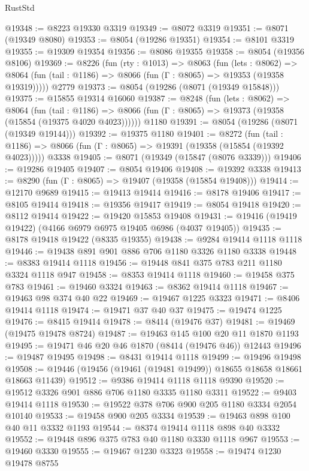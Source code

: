 \begin{lexlean}{RustStd}
\begin{coremodule}
@19348 := @8223 @19330 @3319
@19349 := @8072 @3319
@19351 := @8071 (@19349 @8080)
@19353 := @8054 (@19286 @19351)
@19354 := @8101 @3319
@19355 := @19309 @19354
@19356 := @8086 @19355
@19358 := @8054 (@19356 @8106)
@19369 := @8226
    (fun (rty : @1013) =>
    @8063
      (fun (lets : @8062) =>
      @8064 (fun (tail : @1186) => @8066 (fun (Γ : @8065) => @19353 (@19358 @19319)))))
    @2779
@19373 := @8054 (@19286 (@8071 (@19349 @15848)))
@19375 := @15855 @19314 @16060
@19387 := @8248
    (fun (lets : @8062) =>
    @8064
      (fun (tail : @1186) =>
      @8066 (fun (Γ : @8065) => @19373 (@19358 (@15854 (@19375 @4020 @4023))))))
    @1180
@19391 := @8054 (@19286 (@8071 (@19349 @19144)))
@19392 := @19375 @1180
@19401 := @8272
    (fun (tail : @1186) => @8066 (fun (Γ : @8065) => @19391 (@19358 (@15854 (@19392 @4023)))))
    @3338
@19405 := @8071 (@19349 (@15847 (@8076 @3339)))
@19406 := @19286 @19405
@19407 := @8054 @19406
@19408 := @19392 @3338
@19413 := @8290 (fun (Γ : @8065) => @19407 (@19358 (@15854 @19408)))
@19414 := @12170 @9689
@19415 := @19413 @19414
@19416 := @8178 @19406
@19417 := @8105 @19414
@19418 := @19356 @19417
@19419 := @8054 @19418
@19420 := @8112 @19414
@19422 := @19420 @15853 @19408
@19431 := @19416 (@19419 @19422) (@4166 @6979 @6975 @19405 @6986 (@4037 @19405))
@19435 := @8178 @19418 @19422 (@8335 @19355)
@19438 := @9284 @19414 @1118 @1118
@19446 := @19438 @891 @901 @886 @706 @1180 @3326 @1180 @3338
@19448 := @8383 @19414 @1118
@19456 := @19448 @841 @375 @783 @211 @1180 @3324 @1118 @947
@19458 := @8353 @19414 @1118
@19460 := @19458 @375 @783
@19461 := @19460 @3324
@19463 := @8362 @19414 @1118
@19467 := @19463 @98 @374 @40 @22
@19469 := @19467 @1225 @3323
@19471 := @8406 @19414 @1118
@19474 := @19471 @37 @40 @37
@19475 := @19474 @1225
@19476 := @8415 @19414
@19478 := @8414 (@19476 @37)
@19481 := @19469 (@19475 @19478 @8724)
@19487 := @19463 @145 @100 @20 @11 @1870 @1193
@19495 := @19471 @46 @20 @46 @1870 (@8414 (@19476 @46)) @12443
@19496 := @19487 @19495
@19498 := @8431 @19414 @1118
@19499 := @19496 @19498
@19508 := @19446 (@19456 (@19461 (@19481 @19499)) @18655 @18658 @18661 @18663 @11439)
@19512 := @9386 @19414 @1118 @1118 @9390
@19520 := @19512 @3326 @901 @886 @706 @1180 @3335 @1180 @3311
@19522 := @9403 @19414 @1118
@19530 := @19522 @378 @706 @900 @205 @1180 @3334 @2054 @10140
@19533 := @19458 @900 @205 @3334
@19539 := @19463 @898 @100 @40 @11 @3332 @1193
@19544 := @8374 @19414 @1118 @898 @40 @3332
@19552 := @19448 @896 @375 @783 @40 @1180 @3330 @1118 @967
@19553 := @19460 @3330
@19555 := @19467 @1230 @3323
@19558 := @19474 @1230 @19478 @8755

\end{coremodule}
\end{lexlean}
